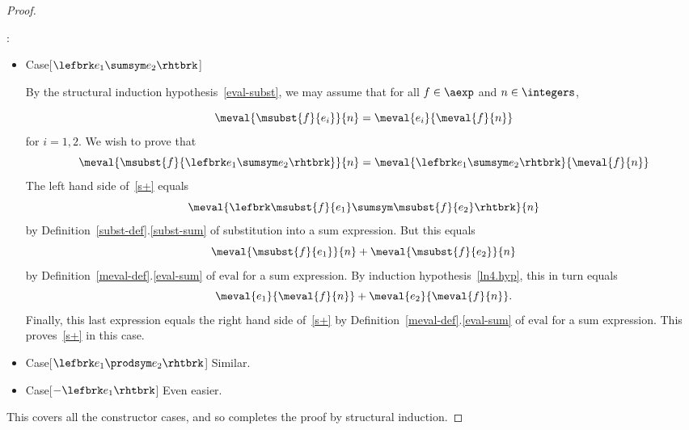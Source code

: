 \begin{definition}
\begin{proof}
\begin{itemize}
\end{itemize}

:
\begin{itemize}

\item Case[$\lefbrk e_1 \sumsym e_2 \rhtbrk$]

  By the structural induction hypothesis~\eqref{eval-subst}, we may assume
  that for all $f \in \aexp$ and $n \in \integers$,

\begin{equation}\label{ln4.hyp}
\meval{\msubst{f}{e_i}}{n}  =  \meval{e_i}{\meval{f}{n}}
\end{equation}
for $i= 1,2$.  We wish to prove that
\begin{equation}\label{s+}
\meval{\msubst{f}{\lefbrk e_1\sumsym e_2 \rhtbrk}}{n}  =  \meval{\lefbrk e_1 \sumsym e_2 \rhtbrk}{ \meval{f}{n}}
\end{equation}
The left hand side of~\eqref{s+} equals
\[
\meval{\lefbrk \msubst{f}{e_1} \sumsym \msubst{f}{e_2} \rhtbrk}{ n}
\]
by Definition~\ref{subst-def}.\ref{subst-sum} of substitution into a sum
expression.  But this equals
\[
\meval{\msubst{f}{e_1}}{n} + \meval{\msubst{f}{e_2}}{n}
\]
by Definition~\ref{meval-def}.\eqref{eval-sum} of $\text{eval}$ for a sum expression.  By
induction hypothesis~\eqref{ln4.hyp}, this in turn equals
\[
\meval{e_1}{\meval{f}{n}} + \meval{e_2}{\meval{f}{n}}.
\]
Finally, this last expression equals the right hand side of~\eqref{s+} by
Definition~\ref{meval-def}.\eqref{eval-sum} of $\text{eval}$ for a sum
expression.  This proves~\eqref{s+} in this case.

\item Case[$\lefbrk e_1 \prodsym e_2 \rhtbrk$]  Similar.

\item Case[$-\lefbrk e_1 \rhtbrk$]  Even easier.

\end{itemize}

This covers all the constructor cases, and so completes the proof by
structural induction.

\end{proof}

\begin{problems}
\practiceproblems
{}

\classproblems
{}

\homeworkproblems
{}
\end{problems}



\end{definition}
